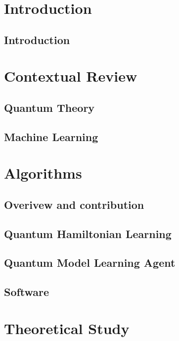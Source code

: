 
\part*{Introduction}\label{part:intro}
    \chapter{Introduction}\label{chapter:intro}
        

\part{Contextual Review}\label{part:contextual_review}
    \chapter{Quantum Theory}\label{chapter:qm}
        
    \chapter{Machine Learning}\label{chapter:ml}
        

\part{Algorithms}\label{part:algorithms}
    \chapter*{Overivew and contribution}
        
    \chapter{Quantum Hamiltonian Learning}\label{chapter:qhl}
        
    \chapter{Quantum Model Learning Agent}\label{chapter:qmla}
        
    \chapter{Software}\label{chapter:sw}
        

\part{Theoretical Study}\label{part:theoretical_study}
